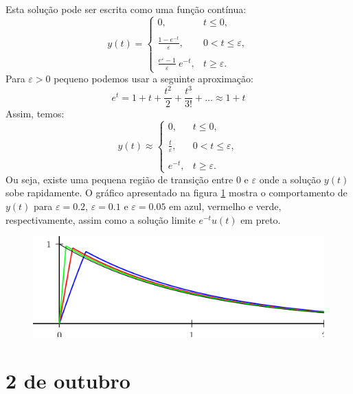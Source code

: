 \documentclass[a4paper,10pt]{book}
\begin{document}
Esta solução pode ser escrita como uma função contínua:
\begin{equation}y(t)=\left\{\begin{array}{ll}
0,&t\leq 0,\\~\\
\frac{1-e^{-t}}{\varepsilon},&0<t\leq \varepsilon,\\~\\
\frac{e^{\varepsilon}-1}{\varepsilon}~\!
e^{-t},&t\geq \varepsilon.
\end{array}
\right.\end{equation}
Para $\varepsilon>0$ pequeno podemos usar a seguinte aproximação:
\begin{equation}e^t=1+t+\frac{t^2}{2}+\frac{t^3}{3!}+\ldots \approx 1+t\end{equation}
Assim, temos:
\begin{equation}y(t)\approx\left\{\begin{array}{ll}
0,&t\leq 0,\\~\\
\frac{t}{\varepsilon},&0<t\leq \varepsilon,\\~\\
e^{-t},&t\geq \varepsilon.
\end{array}
\right.\end{equation}
Ou seja, existe uma pequena região de transição entre $0$ e $\varepsilon$ onde a solução $y(t)$ sobe rapidamente. O gráfico apresentado na figura \ref{concentracao_2} mostra o comportamento de $y(t)$ para $\varepsilon=0.2$, $\varepsilon=0.1$ e $\varepsilon=0.05$ em azul, vermelho e verde, respectivamente, assim como a solução limite $e^{-t}u(t)$ em preto.
\begin{figure}[!ht]
\begin{center}

\includegraphics{figs/figura_dirac_13} \end{center}
\caption{\label{concentracao_2}}
 \end{figure}
 

 \chapter{2 de outubro}
 
\end{document}

